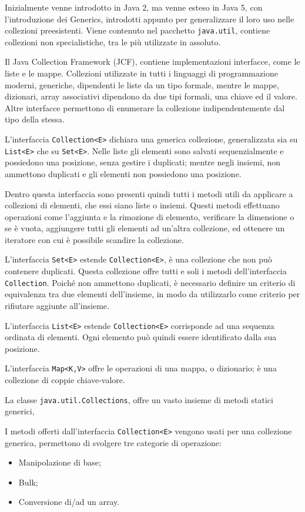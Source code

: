 \documentclass{article}
\numberwithin{equation}{subsection}
\begin{document}
Inizialmente venne introdotto in Java 2, ma venne esteso in Java 5, con l'introduzione dei Generics, introdotti appunto per generalizzare il loro uso nelle collezioni 
preesistenti. 
Viene contenuto nel pacchetto \verb|java.util|, contiene collezioni non specialistiche, tra le più utilizzate in assoluto. 

Il Java Collection Framework (JCF), contiene implementazioni interfacce, come le liste e le mappe. Collezioni utilizzate in tutti i linguaggi di programmazione moderni, 
generiche, dipendenti le liste da un tipo formale, mentre le mappe, dizionari, array associativi dipendono da due tipi formali, una chiave ed il valore. 
Altre interfacce permettono di enumerare la collezione indipendentemente dal tipo della stessa. 

L'interfaccia \verb|Collection<E>| dichiara una generica collezione, generalizzata sia su \verb|List<E>| che su \verb|Set<E>|. Nelle liste gli elementi sono salvati sequenzialmente 
e possiedono una posizione, senza gestire i duplicati; mentre negli insiemi, non ammettono duplicati e gli elementi non possiedono una posizione. 

Dentro questa interfaccia sono presenti quindi tutti i metodi utili da applicare a collezioni di elementi, che essi siano liste o insiemi. Questi metodi effettuano operazioni 
come l'aggiunta e la rimozione di elemento, verificare la dimensione o se è vuota, aggiungere tutti gli elementi ad un'altra collezione, ed ottenere un iteratore con cui 
è possibile scandire la collezione. 


L'interfaccia \verb|Set<E>| estende \verb|Collection<E>|, è una collezione che non può contenere duplicati. Questa collezione offre tutti e soli i metodi dell'interfaccia 
\verb|Collection|. 
Poiché non ammettono duplicati, è necessario definire un criterio di equivalenza tra due elementi dell'insieme, in modo da utilizzarlo come criterio per rifiutare aggiunte 
all'insieme. 

L'interfaccia \verb|List<E>| estende \verb|Collection<E>| corrisponde ad una sequenza ordinata di elementi. Ogni elemento può quindi essere identificato dalla sua posizione. 

L'interfaccia \verb|Map<K,V>| offre le operazioni di una mappa, o dizionario; è una collezione di coppie chiave-valore. 

La classe \verb|java.util.Collections|, offre un vasto insieme di metodi statici generici, %


I metodi offerti dall'interfaccia \verb|Collection<E>| vengono usati per una collezione generica, permettono di svolgere tre categorie di operazione:
\begin{itemize}
    \item Manipolazione di base;
    \item Bulk;
    \item Conversione di/ad un array. 
\end{itemize}
\end{document}

